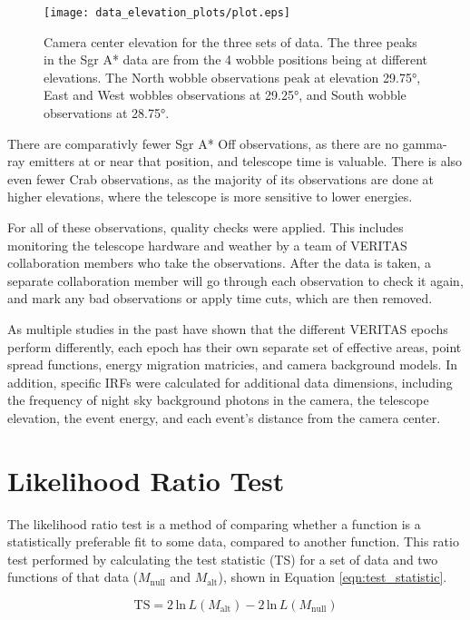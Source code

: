   \begin{figure}[ht]
    \centering
    \texttt{[image: data\_elevation\_plots/plot.eps]}
    \caption[VERITAS Data Elevation Exposure]{
      Camera center elevation for the three sets of data.
      The three peaks in the Sgr A* data are from the 4 wobble positions being at different elevations.
      The North wobble observations peak at elevation \nicetilde\ang{29.75}, East and West wobbles observations at \nicetilde\ang{29.25}, and South wobble observations at \nicetilde\ang{28.75}.
    }
    \label{fig:datapointingelevations}
  \end{figure}

  There are comparativly fewer Sgr A* Off observations, as there are no gamma-ray emitters at or near that position, and telescope time is valuable.
  There is also even fewer Crab observations, as the majority of its observations are done at higher elevations, where the telescope is more sensitive to lower energies.
  
  For all of these observations, quality checks were applied.
  This includes monitoring the telescope hardware and weather by a team of VERITAS collaboration members who take the observations.
  After the data is taken, a separate collaboration member will go through each observation to check it again, and mark any bad observations or apply time cuts, which are then removed.

  As multiple studies in the past have shown that the different VERITAS epochs perform differently, each epoch has their own separate set of effective areas, point spread functions, energy migration matricies, and camera background models.
  In addition, specific IRFs were calculated for additional data dimensions, including the frequency of night sky background photons in the camera, the telescope elevation, the event energy, and each event's distance from the camera center.

\section{Likelihood Ratio Test}
  The likelihood ratio test is a method of comparing whether a function is a statistically preferable fit to some data, compared to another function.
  This ratio test performed by calculating the test statistic (TS) for a set of data and two functions of that data ($M_{\text{null}}$ and $M_{\text{alt}}$), shown in Equation \ref{eqn:test_statistic}.
  
  \begin{equation}\label{eqn:test_statistic}
    \text{TS} = 2 \, \text{ln} \, L \left(M_{\text{alt}} \right ) - 2 \, \text{ln} \, L \left( M_{\text{null}} \right )
  \end{equation}
  
